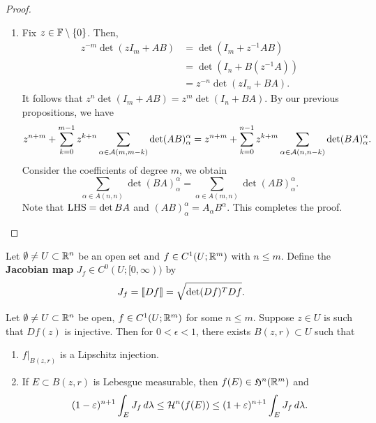 \documentclass[a4paper]{article}
\begin{document}
\begin{proof}
\begin{enumerate}
    \item Fix $z \in \mathbb{F} \setminus \left\{ 0 \right\}$. Then,
          \[
            \begin{aligned}
              z^{-m} \det(z I_m + AB)
               & = \det(I_m + z^{-1} AB)    \\
               & = \det(I_n + B (z^{-1} A)) \\
               & = z^{-n} \det(z I_n + BA).
            \end{aligned}
          \]
          It follows that $z^n \det(I_m + AB) = z^m \det(I_n + BA)$. By
          our previous propositions, we have
          \[
            z^{n+m} + \sum_{k=0}^{m-1}
            z^{k+n} \sum_{\alpha \in \mathcal{A}(m, m-k)} \det(AB)_\alpha^\alpha
            = z^{n + m} + \sum_{k=0}^{n-1} z^{k+m}
            \sum_{\alpha \in \mathcal{A}(n, n - k)} \det (BA)_\alpha^\alpha.
          \]
          Consider the coefficients of degree $m$, we obtain
          \[
            \sum_{\alpha \in A(n, n)} \det(BA)_\alpha^\alpha
            = \sum_{\alpha \in A(m, n)} \det(AB)_\alpha^\alpha.
          \]
          Note that $\operatorname{LHS} = \det BA$ and $(AB)_\alpha^\alpha = A_\alpha
          B^\alpha$. This completes the proof.
  \end{enumerate}
\end{proof}

\begin{defi}
  Let $\emptyset \neq U \subset \mathbb{R}^n$ be an open set and
  $f \in C^1 (U; \mathbb{R}^m)$ with $n \leq m$. Define the
  \textbf{Jacobian map} $J_f \in C^0 (U; [0, \infty))$
  by
  \[
    J_f = \left\llbracket Df \right\rrbracket = \sqrt{\det (Df)^T Df}.
  \]
\end{defi}

\begin{lemma}
  Let $\emptyset \neq U \subset \mathbb{R}^n$ be open, $f \in C^1 (U ; \mathbb{R}^m)$ for
  some $n \leq m$. Suppose $z \in U$ is such that $Df(z)$ is injective.
  Then for $0 < \epsilon < 1$, there exists $B(z, r) \subset U$ such that
  \begin{enumerate}
    \item $f \vert_{B(z, r)}$ is a Lipschitz injection.
    \item If $E \subset B(z, r)$ is Lebesgue measurable, then $f(E) \in
          \mathfrak{H}^n (\mathbb{R}^m)$ and
          \[
            (1 - \varepsilon)^{n+1}
            \int_E J_f \, d \lambda
            \leq \mathcal{H}^n (f(E)) \leq
            (1 + \varepsilon)^{n+1} \int_E J_f \, d \lambda.
          \]
  \end{enumerate}
\end{lemma}
\end{document}
